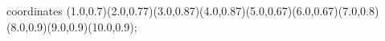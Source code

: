 					coordinates { (1.0,0.7)(2.0,0.77)(3.0,0.87)(4.0,0.87)(5.0,0.67)(6.0,0.67)(7.0,0.8)(8.0,0.9)(9.0,0.9)(10.0,0.9)};